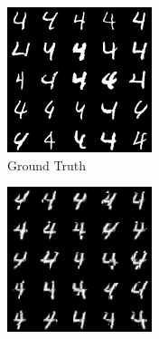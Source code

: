 \begin{figure}[H]
    \centering
    \begin{subfigure}[b]{0.24\textwidth}
        \centering
        \includegraphics[width=\textwidth]{figures/einsum/mnist/[4]_ground_truth.png}
        \caption{Ground Truth}
    \end{subfigure}
    \begin{subfigure}[b]{0.24\textwidth}
        \centering
        \includegraphics[width=\textwidth]{figures/einsum/mnist/[4]_EM.png}

\end{subfigure}
\end{figure}
